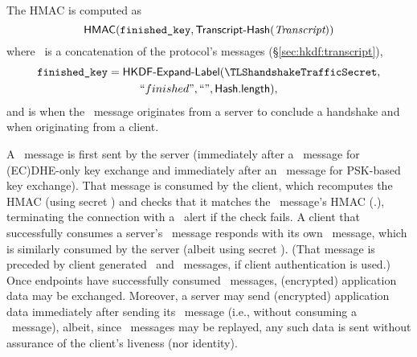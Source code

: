 \noindent
The HMAC is computed as  
\[
  \textsf{HMAC}(\texttt{finished\_key},\textsf{Transcript-Hash}(\textit{Transcript}))
\]
where \TLSHandshakeMessage\ is a concatenation of the protocol's messages (\S\ref{sec:hkdf:transcript}),
\begin{multline*}
  \TLSfinishedKey =   \HKDFExpandLabel(\TLShandshakeTrafficSecret,\\ ``finished", ``", \HashLength),
\end{multline*}
%
%
%
and \TLSField{[sender]} is  when the \Finished\ message originates from
a server to conclude a handshake and  when originating from a client. %


A \Finished\ message is first sent by the server (immediately after a \CertificateVerify\ message 
for (EC)DHE-only key exchange and immediately after an \EncryptedExtensions\ message for PSK-based 
key exchange). That message is consumed by the client, which recomputes the HMAC (using secret
\TLSserverHandshakeTrafficSecret) and checks that it matches the \Finished\ message's HMAC 
(\Finished.\TLSverifyData), terminating the connection with a \TLSdecryptError\ alert if the check 
fails. A client that successfully consumes a server's \Finished\ message responds with its own \Finished\
message, which is similarly consumed by the server (albeit using secret \TLSclientHandshakeTrafficSecret).
(That message is preceded by client generated \Certificate\ and \CertificateVerify\ messages, if 
client authentication is used.) Once endpoints have successfully consumed \Finished\ messages, 
(encrypted) application data may be exchanged. Moreover, a server may send (encrypted) application 
data immediately after sending its \Finished\ message (i.e., without consuming a \Finished\ message), 
albeit, since \ClientHello\ messages may be replayed, any such data is sent without assurance of the 
client's liveness (nor identity). 

